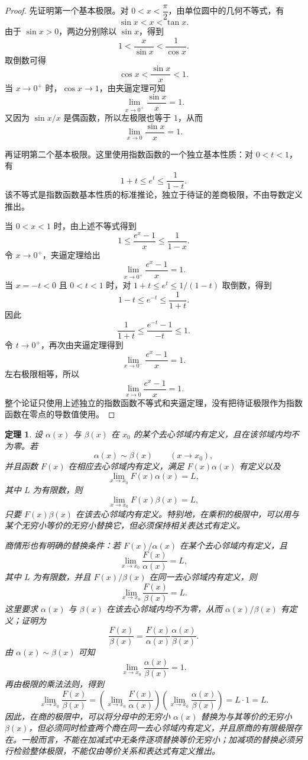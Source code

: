 \documentclass[UTF8,fontset=fandol,11pt]{ctexart}
\newtheorem{theorem}[definition]{定理}
\begin{document}
\begin{proof}
先证明第一个基本极限。对 $0<x<\dfrac{\pi}{2}$，由单位圆中的几何不等式，有
\[
\sin x<x<\tan x.
\]
由于 $\sin x>0$，两边分别除以 $\sin x$，得到
\[
1<\frac{x}{\sin x}<\frac{1}{\cos x}.
\]
取倒数可得
\[
\cos x<\frac{\sin x}{x}<1.
\]
当 $x\to0^+$ 时，$\cos x\to1$，由夹逼定理可知
\[
\lim_{x\to0^+}\frac{\sin x}{x}=1.
\]
又因为 $\sin x/x$ 是偶函数，所以左极限也等于 $1$，从而
\[
\lim_{x\to0}\frac{\sin x}{x}=1.
\]

再证明第二个基本极限。这里使用指数函数的一个独立基本性质：对 $0<t<1$，有
\[
1+t\le e^t\le\frac{1}{1-t}.
\]
该不等式是指数函数基本性质的标准推论，独立于待证的差商极限，不由导数定义推出。

当 $0<x<1$ 时，由上述不等式得到
\[
1\le\frac{e^x-1}{x}\le\frac{1}{1-x}.
\]
令 $x\to0^+$，夹逼定理给出
\[
\lim_{x\to0^+}\frac{e^x-1}{x}=1.
\]
当 $x=-t<0$ 且 $0<t<1$ 时，对 $1+t\le e^t\le1/(1-t)$ 取倒数，得到
\[
1-t\le e^{-t}\le\frac{1}{1+t}.
\]
因此
\[
\frac{1}{1+t}\le\frac{e^{-t}-1}{-t}\le1.
\]
令 $t\to0^+$，再次由夹逼定理得到
\[
\lim_{x\to0^-}\frac{e^x-1}{x}=1.
\]
左右极限相等，所以
\[
\lim_{x\to0}\frac{e^x-1}{x}=1.
\]
整个论证只使用上述独立的指数函数不等式和夹逼定理，没有把待证极限作为指数函数在零点的导数值使用。
\end{proof}
\begin{theorem}
设 $\alpha(x)$ 与 $\beta(x)$ 在 $x_0$ 的某个去心邻域内有定义，且在该邻域内均不为零。若
\[
\alpha(x)\sim\beta(x)\qquad(x\to x_0),
\]
并且函数 $F(x)$ 在相应去心邻域内有定义，满足 $F(x)\alpha(x)$ 有定义以及
\[
\lim_{x\to x_0}F(x)\alpha(x)=L,
\]
其中 $L$ 为有限数，则
\[
\lim_{x\to x_0}F(x)\beta(x)=L,
\]
只要 $F(x)\beta(x)$ 在该去心邻域内有定义。特别地，在乘积的极限中，可以用与某个无穷小等价的无穷小替换它，但必须保持相关表达式有定义。

商情形也有明确的替换条件：若 $F(x)/\alpha(x)$ 在某个去心邻域内有定义，且
\[
\lim_{x\to x_0}\frac{F(x)}{\alpha(x)}=L,
\]
其中 $L$ 为有限数，并且 $F(x)/\beta(x)$ 在同一去心邻域内有定义，则
\[
\lim_{x\to x_0}\frac{F(x)}{\beta(x)}=L.
\]
这里要求 $\alpha(x)$ 与 $\beta(x)$ 在该去心邻域内均不为零，从而 $\alpha(x)/\beta(x)$ 有定义；证明为
\[
\frac{F(x)}{\beta(x)}=\frac{F(x)}{\alpha(x)}\frac{\alpha(x)}{\beta(x)}.
\]
由 $\alpha(x)\sim\beta(x)$ 可知
\[
\lim_{x\to x_0}\frac{\alpha(x)}{\beta(x)}=1.
\]
再由极限的乘法法则，得到
\[
\lim_{x\to x_0}\frac{F(x)}{\beta(x)}
=\left(\lim_{x\to x_0}\frac{F(x)}{\alpha(x)}\right)
\left(\lim_{x\to x_0}\frac{\alpha(x)}{\beta(x)}\right)
=L\cdot1=L.
\]
因此，在商的极限中，可以将分母中的无穷小 $\alpha(x)$ 替换为与其等价的无穷小 $\beta(x)$，但必须同时检查两个商在同一去心邻域内有定义，并且原商的有限极限存在。一般而言，不能在加减式中无条件逐项替换等价无穷小；加减项的替换必须另行检验整体极限，不能仅由等价关系和表达式有定义推出。\label{thm:equivalent-substitution}
\end{theorem}
\end{document}
